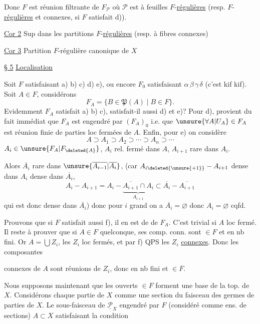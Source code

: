  Donc $F$ est réunion filtrante de $F_{\mathcal P}$ où $\mathcal P$ est à feuilles $F$-\uline{régulières} (resp. $F$-\uline{régulières} et connexes, si $F$ satisfait d)).

\uline{Cor 2} Sup  dans les partitions $F$-\uline{régulières} (resp. à fibres connexes)

\uline{Cor 3} Partition $F$-régulière canonique de $X$


\uline{§ 5} \uline{Localisation}

Soit $F$ satisfaisant a) b) c) d) e), ou encore $F_0$ satisfaisant $\alpha\,\beta\,\gamma\,\delta$ (c'est kif kif). Soit $A\in F$, considérons
\[
F_A=\{B\in\mathfrak P(A)\mid B\in F\}.
\]
Evidemment $F_A$ satisfait a) b) c), satisfait-il aussi d) et e)? Pour d),  provient du fait immédiat que $F_A$ est engendré par $(F_A)_0$ i.e. que $\unsure{\forall A|U_A}\in F_A$ est réunion finie de parties loc fermées  de $A$.  Enfin, pour e) on considère
\[
A\supset A_1\supset A_2\supset\cdots\supset A_n\supset\cdots
\]
$A_i\in \unsure{F_A|F_{\deleted{A}}}$, $A_i$ rel. fermé dans $A$, $A_{i+1}$ rare dans $A_i$.

Alors $\overline{A_i}$ rare dans $\unsure{\overline{A_{i-1}}|\overline{A_i}}$,  (car $A_{i\deleted{\unsure{+1}}}-A_{i+1}$ dense dans $A_i$ dense dans $\overline{A_i}$,  
\[
A_i-A_{i+1}=A_i-\underbrace{\overline{A_{i+1}}\cap A_i}_{A_{i+1}}\subset\overline{A_i}-\overline{A_{i+1}}
\]
qui est donc dense dans $\overline{A_i}$) donc pour $i$ grand on a $\overline{A_i}=\varnothing$ donc $A_i=\varnothing$ cqfd.

Prouvons que si $F$ satisfait aussi f), il en est de  de $F_A$. C'est trivial si $A$ loc fermé. Il reste à prouver que si $A\in F$ quelconque, ses comp. conn. sont $\in F$ et en nb fini. Or $A=\bigcup Z_i$, les $Z_i$ loc fermés, et par f) QPS les $Z_i$ \uline{connexes}. Donc les composantes

connexes de $A$ sont réunions de $Z_i$, donc en nb fini et $\in F$.

Nous supposons maintenant que les ouverts $\in F$ forment une base de la top. de $X$. Considérons chaque partie de $X$ comme une section du faisceau  des germes de parties de $X$. Le sous-faisceau  de $\underline{\mathcal P}_X$ engendré par $F$ (considéré comme ens. de sections)   $A\subset X$ satisfaisant la condition

